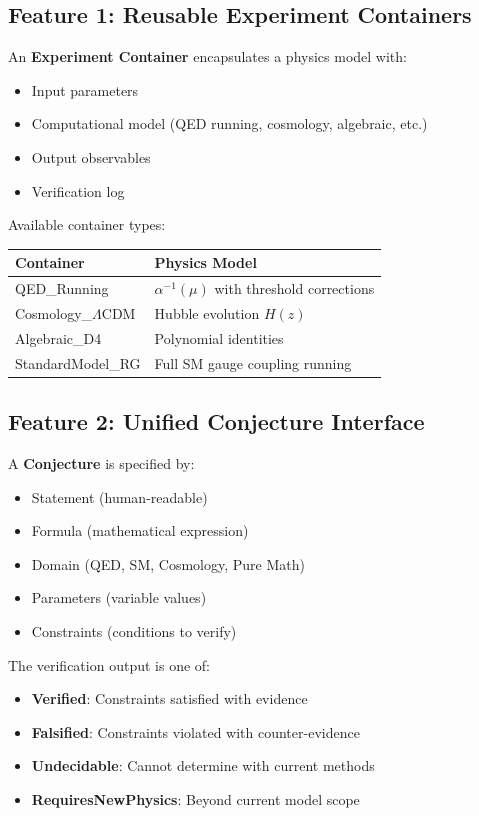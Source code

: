 \documentclass[11pt,a4paper]{article}
\begin{document}
\subsection{Feature 1: Reusable Experiment Containers}

An \textbf{Experiment Container} encapsulates a physics model with:
\begin{itemize}
    \item Input parameters
    \item Computational model (QED running, cosmology, algebraic, etc.)
    \item Output observables
    \item Verification log
\end{itemize}

Available container types:
\begin{center}
\begin{tabular}{|l|l|}
\hline
Container & Physics Model \\
\hline
QED\_Running & $\alpha^{-1}(\mu)$ with threshold corrections \\
Cosmology\_$\Lambda$CDM & Hubble evolution $H(z)$ \\
Algebraic\_D4 & Polynomial identities \\
StandardModel\_RG & Full SM gauge coupling running \\
\hline
\end{tabular}
\end{center}

\subsection{Feature 2: Unified Conjecture Interface}

A \textbf{Conjecture} is specified by:
\begin{itemize}
    \item Statement (human-readable)
    \item Formula (mathematical expression)
    \item Domain (QED, SM, Cosmology, Pure Math)
    \item Parameters (variable values)
    \item Constraints (conditions to verify)
\end{itemize}

The verification output is one of:
\begin{itemize}
    \item \textbf{Verified}: Constraints satisfied with evidence
    \item \textbf{Falsified}: Constraints violated with counter-evidence
    \item \textbf{Undecidable}: Cannot determine with current methods
    \item \textbf{RequiresNewPhysics}: Beyond current model scope
\end{itemize}
\end{document}
